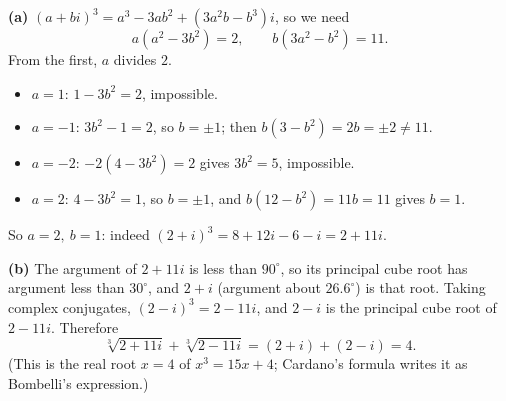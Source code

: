 \textbf{(a)} $(a+bi)^3=a^3-3ab^2+\left(3a^2b-b^3\right)i$, so we need
\[a\left(a^2-3b^2\right)=2,\qquad b\left(3a^2-b^2\right)=11.\]
From the first, $a$ divides $2$.
\begin{itemize}
\item $a=1$: $1-3b^2=2$, impossible.
\item $a=-1$: $3b^2-1=2$, so $b=\pm1$; then $b\left(3-b^2\right)=2b=\pm2\ne11$.
\item $a=-2$: $-2\left(4-3b^2\right)=2$ gives $3b^2=5$, impossible.
\item $a=2$: $4-3b^2=1$, so $b=\pm1$, and $b\left(12-b^2\right)=11b=11$ gives $b=1$.
\end{itemize}
So $\boxed{a=2,\ b=1}$: indeed $(2+i)^3=8+12i-6-i=2+11i$.

\textbf{(b)} The argument of $2+11i$ is less than $90^\circ$, so its principal cube root has argument less than $30^\circ$, and $2+i$ (argument about $26.6^\circ$) is that root. Taking complex conjugates, $(2-i)^3=2-11i$, and $2-i$ is the principal cube root of $2-11i$. Therefore
\[\sqrt[3]{2+11i}+\sqrt[3]{2-11i}=(2+i)+(2-i)=\boxed{4}.\]
(This is the real root $x=4$ of $x^3=15x+4$; Cardano's formula writes it as Bombelli's expression.)
